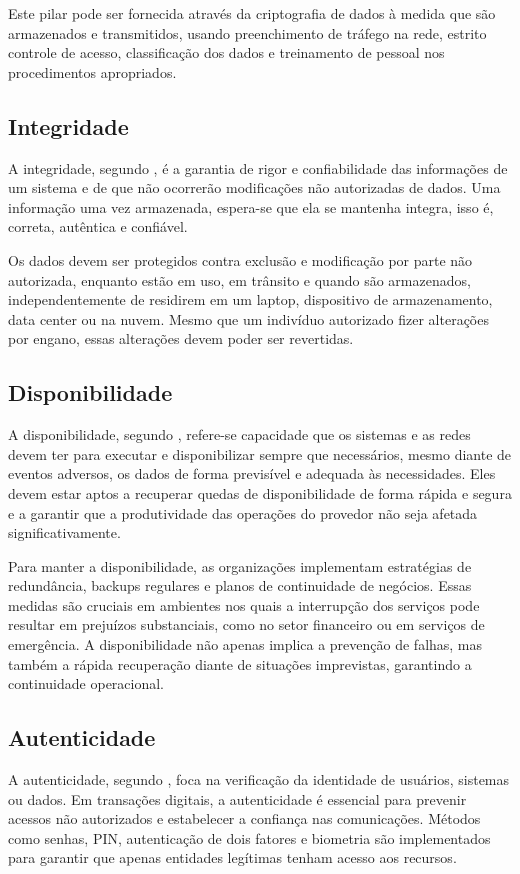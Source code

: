    Este pilar pode ser fornecida através da criptografia de dados à medida que são armazenados e transmitidos, usando preenchimento de tráfego na rede, estrito controle de acesso, classificação dos dados e treinamento de pessoal nos procedimentos apropriados.
    
    \subsection{Integridade}
    A integridade, segundo , é a garantia de rigor e confiabilidade das informações de um sistema e de que não ocorrerão modificações não autorizadas de dados. Uma informação uma vez armazenada, espera-se que ela se mantenha integra, isso é, correta, autêntica e confiável. 
    
    Os dados devem ser protegidos contra exclusão e modificação por parte não autorizada, enquanto estão em uso, em trânsito e quando são armazenados, independentemente de residirem em um laptop, dispositivo de armazenamento, data center ou na nuvem. Mesmo que um indivíduo autorizado fizer alterações por engano, essas alterações devem poder ser revertidas.
    
    \subsection{Disponibilidade}
    A disponibilidade, segundo , refere-se capacidade que os sistemas e as redes devem ter para executar e disponibilizar sempre que necessários, mesmo diante de eventos adversos, os dados de forma previsível e adequada às necessidades. Eles devem estar aptos a recuperar quedas de disponibilidade de forma rápida e segura e a garantir que a produtividade das operações do provedor não seja afetada significativamente. 
    
    Para manter a disponibilidade, as organizações implementam estratégias de redundância, backups regulares e planos de continuidade de negócios. Essas medidas são cruciais em ambientes nos quais a interrupção dos serviços pode resultar em prejuízos substanciais, como no setor financeiro ou em serviços de emergência. A disponibilidade não apenas implica a prevenção de falhas, mas também a rápida recuperação diante de situações imprevistas, garantindo a continuidade operacional.
    
    \subsection{Autenticidade}
    A autenticidade, segundo , foca na verificação da identidade de usuários, sistemas ou dados. Em transações digitais, a autenticidade é essencial para prevenir acessos não autorizados e estabelecer a confiança nas comunicações. Métodos como senhas, PIN, autenticação de dois fatores e biometria são implementados para garantir que apenas entidades legítimas tenham acesso aos recursos. 
    
